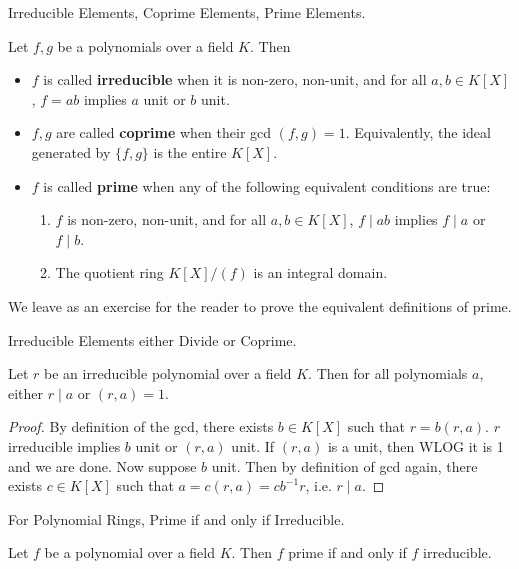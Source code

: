 \documentclass[../book.tex]{subfiles}
\begin{document}
\begin{dfn} Irreducible Elements, Coprime Elements, Prime Elements.
    
    Let $f, g$ be a polynomials over a field $K$. 
    Then \begin{itemize}
        \item $f$ is called \textbf{irreducible} when it is non-zero, non-unit, and
            for all $a, b \in K[X]$, $f = a b$ implies $a$ unit or $b$ unit.
        \item $f, g$ are called \textbf{coprime} when their gcd $(f,g) = 1$.
            Equivalently, the ideal generated by $\{f,g\}$ is the entire $K[X]$.
        \item $f$ is called \textbf{prime} when any of the following 
            equivalent conditions are true: 
            \begin{enumerate}
                \item $f$ is non-zero, non-unit, and for all $a, b \in K[X]$, 
                $f \mid ab$ implies $f \mid a$ or $f \mid b$.
                \item The quotient ring $K[X]/(f)$ is an integral domain.
            \end{enumerate}
    \end{itemize}
    We leave as an exercise for the reader to prove 
    the equivalent definitions of prime. 
\end{dfn}
\begin{lem} Irreducible Elements either Divide or Coprime.
    
    Let $r$ be an irreducible polynomial over a field $K$.
    Then for all polynomials $a$, either $r \mid a$ or $(r,a) = 1$.
\end{lem}
\begin{proof}
    By definition of the gcd, there exists $b \in K[X]$ such that $r = b(r,a)$.
    $r$ irreducible implies $b$ unit or $(r,a)$ unit. 
    If $(r,a)$ is a unit, then WLOG it is 1 and we are done.
    Now suppose $b$ unit. Then by definition of gcd again, 
    there exists $c \in K[X]$ such that $a = c(r,a) = cb^{-1}r$, 
    i.e. $r \mid a$. 
\end{proof}
\begin{thm} For Polynomial Rings, Prime if and only if Irreducible.
    
    Let $f$ be a polynomial over a field $K$. 
    Then $f$ prime if and only if $f$ irreducible.
\end{thm}
\end{document}
